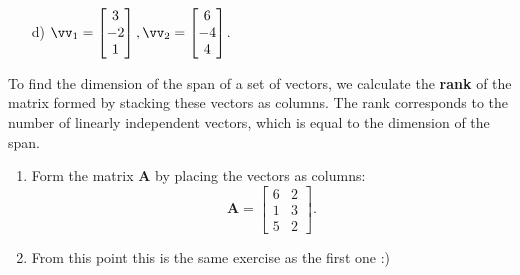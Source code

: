 \begin{problem}
\begin{enumerate}
        \item[d) ] $\vv_1=\begin{bmatrix}3\\-2\\1\end{bmatrix},  \vv_2=\begin{bmatrix}
            6\\-4\\4
        \end{bmatrix}$.
        
    \end{enumerate}
\end{problem}
\begin{solution}
    To find the dimension of the span of a set of vectors, we calculate the \textbf{rank} of the matrix formed by stacking these vectors as columns. The rank corresponds to the number of linearly independent vectors, which is equal to the dimension of the span.

\begin{enumerate}
    \item 
    Form the matrix \(\mathbf{A}\) by placing the vectors as columns:
    \[
    \mathbf{A} = \begin{bmatrix}
       6 & 2 \\
       1 & 3 \\
       5 & 2
    \end{bmatrix}.
    \]

    \item From this point this is the same exercise as the first one :)
\end{enumerate}
\end{solution}
